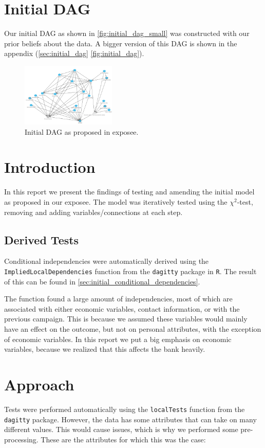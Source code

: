 \documentclass[11pt]{article}
\begin{document}
\begin{multicols}{2}
\section{Initial DAG}
Our initial DAG as shown in \autoref{fig:initial_dag_small} was constructed
with our prior beliefs about the data. A bigger version of this DAG is shown
in the appendix (\autoref{sec:initial_dag} \autoref{fig:initial_dag}). 

\begin{figure}[H]
	\centering
	\includegraphics[width=0.4\textwidth]{images/initial_dag}
	\caption{Initial DAG as proposed in exposee.}
	\label{fig:initial_dag_small}
\end{figure}

\section{Introduction}
In this report we present the findings of testing and amending the initial model
as proposed in our exposee.  The model was iteratively tested using the
$\chi^2$-test, removing and adding variables/connections at each step.

\subsection{Derived Tests}
Conditional independencies were automatically derived using the
\texttt{ImpliedLocalDependencies} function from the \texttt{dagitty} package in
\texttt{R}. The result of this can be found in 
\autoref{sec:initial_conditional_dependencies}.

The function found a large amount of independencies, most of which are associated with either economic variables, contact information, or with the previous campaign. This is because we assumed these variables would mainly have an effect on the outcome, but not on personal attributes, with the exception of economic variables. In this report we put a big emphasis on economic variables, because we realized that this affects the bank heavily.

\section{Approach}
Tests were performed automatically using the \texttt{localTests} function from
the \texttt{dagitty} package.  However, the data has some attributes that can
take on many different values. This would cause issues, which is why we performed some pre-processing. These are the attributes for which this was the case:


\end{multicols}
\end{document}
